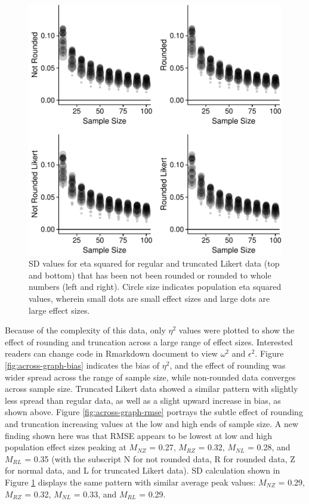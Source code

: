 \documentclass[english,man]{apa6}
\theoremstyle{definition}
\theoremstyle{definition}
\theoremstyle{definition}
\theoremstyle{remark}
\begin{document}
\begin{figure}[htbp]
\centering
\includegraphics{buchanan_scofield_files/figure-latex/across-graph-sd-1.pdf}
\caption{\label{fig:across-graph-sd}SD values for eta squared for regular
and truncated Likert data (top and bottom) that has been not been
rounded or rounded to whole numbers (left and right). Circle size
indicates population eta squared values, wherein small dots are small
effect sizes and large dots are large effect sizes.}
\end{figure}

Because of the complexity of this data, only \(\eta^2\) values were
plotted to show the effect of rounding and truncation across a large
range of effect sizes. Interested readers can change code in Rmarkdown
document to view \(\omega^2\) and \(\epsilon^2\). Figure
\ref{fig:across-graph-bias} indicates the bias of \(\eta^2\), and the
effect of rounding was wider spread across the range of sample size,
while non-rounded data converges across sample size. Truncated Likert
data showed a similar pattern with slightly less spread than regular
data, as well as a slight upward increase in bias, as shown above.
Figure \ref{fig:across-graph-rmse} portrays the subtle effect of
rounding and truncation increasing values at the low and high ends of
sample size. A new finding shown here was that RMSE appears to be lowest
at low and high population effect sizes peaking at \(M_{NZ}\) = 0.27,
\(M_{RZ}\) = 0.32, \(M_{NL}\) = 0.28, and \(M_{RL}\) = 0.35 (with the
subscript N for not rounded data, R for rounded data, Z for normal data,
and L for truncated Likert data). SD calculation shown in Figure
\ref{fig:across-graph-sd} displays the same pattern with similar average
peak values: \(M_{NZ}\) = 0.29, \(M_{RZ}\) = 0.32, \(M_{NL}\) = 0.33,
and \(M_{RL}\) = 0.29.
\end{document}
